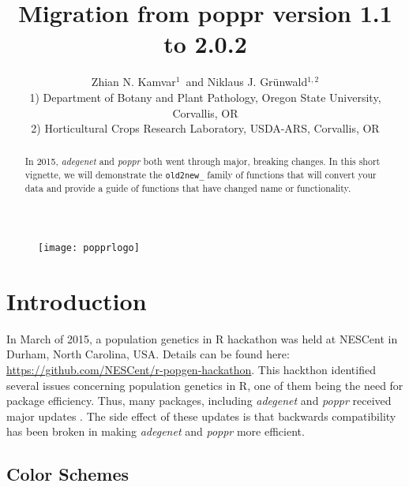 \documentclass[letterpaper]{article}\usepackage[]{graphicx}\usepackage[]{color}
\title{Migration from poppr version 1.1 to 2.0.2}
\author{Zhian N. Kamvar$^{1}$\ and Niklaus J. Gr\"unwald$^{1,2}$\\\scriptsize{1)
Department of Botany and Plant Pathology, Oregon State University, Corvallis,
OR}\\\scriptsize{2) Horticultural Crops Research Laboratory, USDA-ARS,
Corvallis, OR}}
\newcommand{\poppr}{\textit{poppr}}
\newcommand{\Poppr}{\textit{Poppr}}
\newcommand{\adegenet}{\textit{adegenet}}
\begin{document}






\maketitle 
\begin{abstract} 
In 2015, \adegenet{} and \poppr{} both went through major, breaking changes.
In this short vignette, we will demonstrate the \texttt{old2new\_} family of
functions that will convert your data and provide a guide of functions that have
changed name or functionality. 
\end{abstract} 

\begin{figure}[b]   
  \centering
  \label{logo}   
  \texttt{[image: popprlogo]} 
\end{figure} 

\newpage 
\begingroup
  \hypersetup{linkcolor=black} 
  \tableofcontents 
\endgroup 

\section{Introduction}

In March of 2015, a population genetics in R hackathon was held at NESCent in 
Durham, North Carolina, USA. Details can be found here: 
\url{https://github.com/NESCent/r-popgen-hackathon}. This hackthon identified 
several issues concerning population genetics in R, one of them being the need
for package efficiency. Thus, many packages, including \adegenet{} and \poppr{}
received major updates \cite{kamvar2015novel}. The side effect of these updates 
is that backwards compatibility has been broken in making \adegenet{} and 
\poppr{} more efficient.

\subsection{Color Schemes}
\end{document}
